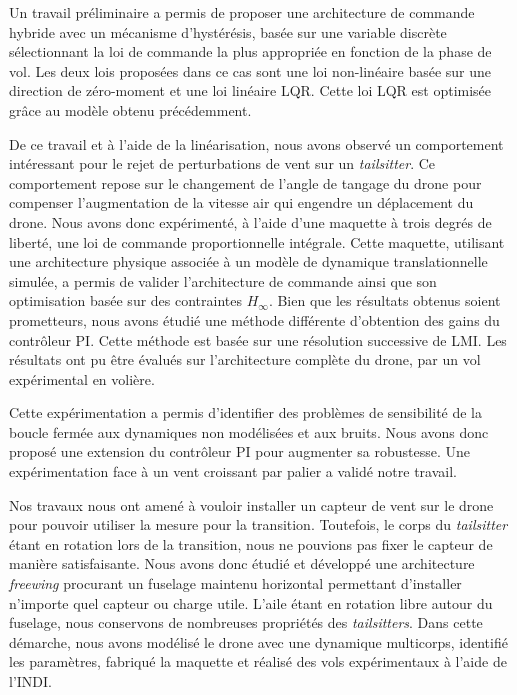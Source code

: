 Un travail préliminaire a permis de proposer une architecture de commande hybride avec un mécanisme d'hystérésis, basée sur une variable discrète sélectionnant la loi de commande la plus appropriée en fonction de la phase de vol. Les deux lois proposées dans ce cas sont une loi non-linéaire basée sur une direction de zéro-moment et une loi linéaire LQR. Cette loi LQR est optimisée grâce au modèle obtenu précédemment.

De ce travail et à l'aide de la linéarisation, nous avons observé un comportement intéressant pour le rejet de perturbations de vent sur un \textit{tailsitter}. Ce comportement repose sur le changement de l'angle de tangage du drone pour compenser l'augmentation de la vitesse air qui engendre un déplacement du drone. Nous avons donc expérimenté, à l'aide d'une maquette à trois degrés de liberté, une loi de commande proportionnelle intégrale. Cette maquette, utilisant une architecture physique associée à un modèle de dynamique translationnelle simulée, a permis de valider l'architecture de commande ainsi que son optimisation basée sur des contraintes $H_{\infty}$.
Bien que les résultats obtenus soient prometteurs, nous avons étudié une méthode différente d'obtention des gains du contrôleur PI. Cette méthode est basée sur une résolution successive de LMI. Les résultats ont pu être évalués sur l'architecture complète du drone, par un vol expérimental en volière.

Cette expérimentation a permis d'identifier des problèmes de sensibilité de la boucle fermée aux dynamiques non modélisées et aux bruits. Nous avons donc proposé une extension du contrôleur PI pour augmenter sa robustesse. Une expérimentation face à un vent croissant par palier a validé notre travail.

Nos travaux nous ont amené à vouloir installer un capteur de vent sur le drone pour pouvoir utiliser la mesure pour la transition. Toutefois, le corps du \textit{tailsitter} étant en rotation lors de la transition, nous ne pouvions pas fixer le capteur de manière satisfaisante. Nous avons donc étudié et développé une architecture \textit{freewing} procurant un fuselage maintenu horizontal permettant d'installer n'importe quel capteur ou charge utile. L'aile étant en rotation libre autour du fuselage, nous conservons de nombreuses propriétés des \textit{tailsitters}. Dans cette démarche, nous avons modélisé le drone avec une dynamique multicorps, identifié les paramètres, fabriqué la maquette et réalisé des vols expérimentaux à l'aide de l'INDI.

